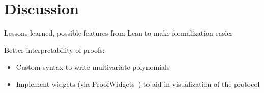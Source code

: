 \section{Discussion}

Lessons learned, possible features from Lean to make formalization easier

Better interpretability of proofs:
\begin{itemize}
    \item Custom syntax to write multivariate polynomials
    \item Implement widgets (via ProofWidgets~\cite{}) to aid in visualization of the protocol
\end{itemize}